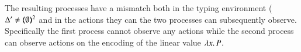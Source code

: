 
The resulting processes have a mismatch both in the typing
environment ($\Delta' \not= (\!\!\langle\emptyset\rangle\!\!)^{2}$
and in the actions they can the two processes can
subsequently observe. Specifically the first process
cannot observe any actions while the second process
can observe actions on the encoding of the linear value $\lambda x.\,P$.

